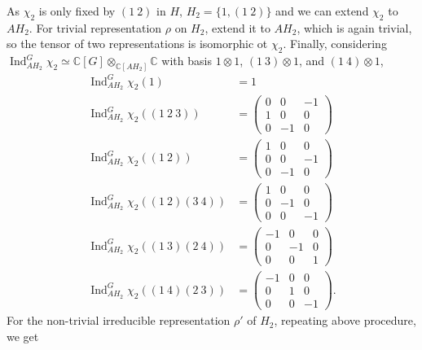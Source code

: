 \documentclass[a4paper, 12pt]{article}
\theoremstyle{Mydefinition}
\theoremstyle{Mytheorem}
\DeclareMathOperator{\Ind}{Ind}
\begin{document}
\begin{enumerate}
    As $\chi_2$ is only fixed by $(1~2)$ in $H$, $H_2 = \{1, (1~2)\}$ and we can extend $\chi_2$ to $AH_2$. For trivial representation $\rho$ on $H_2$, extend it to $AH_2$, which is again trivial, so the tensor of two representations is isomorphic ot $\chi_2$. Finally, considering $\Ind_{AH_2}^G \chi_2\simeq \mathbb{C}[G]\otimes_{\mathbb{C}[AH_2]}\mathbb{C}$ with basis $1\otimes 1$, $(1~3)\otimes 1$, and $(1~4)\otimes 1$,
    \begin{equation}
    \begin{split}
        \Ind_{AH_2}^G \chi_2 (1) &= 1\\
        \Ind_{AH_2}^G \chi_2 ((1~2~3)) &= \begin{pmatrix}
        0 & 0 & -1\\
        1 & 0 & 0\\
        0 & -1 & 0
        \end{pmatrix}\\
        \Ind_{AH_2}^G \chi_2 ((1~2)) &= \begin{pmatrix}
        1 & 0 & 0\\
        0 & 0 & -1\\
        0 & -1 & 0
        \end{pmatrix}\\
        \Ind_{AH_2}^G \chi_2 ((1~2)(3~4)) &= \begin{pmatrix}
        1 & 0 & 0\\
        0 & -1 & 0\\
        0 & 0 & -1
        \end{pmatrix}\\
        \Ind_{AH_2}^G \chi_2 ((1~3)(2~4)) &= \begin{pmatrix}
        -1 & 0 & 0\\
        0 & -1 & 0\\
        0 & 0 & 1
        \end{pmatrix}\\
        \Ind_{AH_2}^G \chi_2 ((1~4)(2~3)) &= \begin{pmatrix}
        -1 & 0 & 0\\
        0 & 1 & 0\\
        0 & 0 & -1
        \end{pmatrix}.
    \end{split}
    \end{equation}
    For the non-trivial irreducible representation $\rho'$ of $H_2$, repeating above procedure, we get
    \begin{equation}
    \begin{split}

\end{split}
\end{equation}
\end{enumerate}
\end{document}
